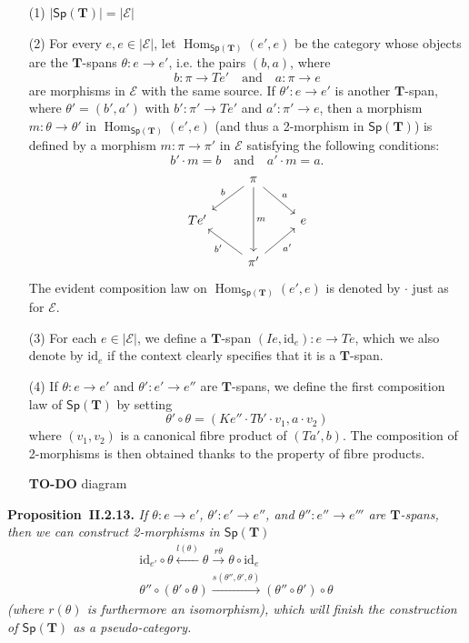 \documentclass[fleqn]{article}
\newenvironment{itenv}[1]
  {\phantomsection\par\medskip\noindent\textbf{#1.}\itshape}
  {\par\medskip}
\newcommand{\oldpage}[1]{\marginpar{\footnotesize$\Big\vert$ \textit{p.~#1}}}
\newcommand{\todo}{{\color{purple}\textbf{TO-DO }}}
\newcommand{\id}{\mathrm{id}}
\newcommand{\TT}{\mathbf{T}}
\newcommand{\textand}{\quad\text{and}\quad}
\newcommand{\cat}[1]{\mathcal{#1}}
\newcommand{\Cat}[1]{\mathsf{#1}}
\newcommand{\set}[1]{|#1|}
\newcommand{\Sp}[1]{\Cat{Sp}(#1)}
\DeclareMathOperator{\Hom}{Hom}
\begin{document}
\begin{enumerate}
  \item[(1)]
    $\set{\Sp{\TT}}=\set{\cat{E}}$

  \item[(2)]
    For every $e,e\in\set{\cat{E}}$, let $\Hom_{\Sp{\TT}}(e',e)$ be the category whose objects are the $\TT$-spans $\theta\colon e\to e'$, i.e. the pairs $(b,a)$, where
    \[
      b\colon\pi\to Te'
      \textand
      a\colon \pi\to e
    \]
    are morphisms in $\cat{E}$ with the same source.
    If $\theta'\colon e\to e'$ is another $\TT$-span, where $\theta'=(b',a')$ with $b'\colon\pi'\to Te'$ and $a'\colon\pi'\to e$, then a morphism $m\colon\theta\to\theta'$ in $\Hom_{\Sp{\TT}}(e',e)$ (and thus a 2-morphism in $\Sp{\TT}$) is defined by a morphism $m\colon\pi\to\pi'$ in $\cat{E}$ satisfying the following conditions:
    \[
      b'\cdot m = b
      \textand
      a'\cdot m = a.
    \]
    \[
      \begin{tikzcd}
      & \pi
          \ar[dl,swap,"b"]
          \ar[dr,"a"]
          \ar[dd,"m"]
      \\Te'
      &&e
      \\&\pi'
          \ar[ul,"b'"]
          \ar[ur,swap,"a'"]
      \end{tikzcd}
    \]
    The evident composition law on $\Hom_{\Sp{\TT}}(e',e)$ is denoted by $\cdot$ just as for $\cat{E}$.

  \item[(3)]
    For each $e\in\set{\cat{E}}$, we define a $\TT$-span $(Ie,\id_e)\colon e\to Te$, which we also denote by $\id_e$ if the context clearly specifies that it is a $\TT$-span.

  \item[(4)]
    If $\theta\colon e\to e'$ and $\theta'\colon e'\to e''$ are $\TT$-spans, we define the first composition law of $\Sp{\TT}$ by setting
    \[
      \theta'\circ\theta
      = (Ke''\cdot Tb'\cdot v_1, a\cdot v_2)
    \]
    where $(v_1,v_2)$ is a canonical fibre product of $(Ta',b)$.
    The composition of 2-morphisms is then obtained thanks to the property of fibre products.

    \oldpage{249}
    \todo{diagram}
\end{enumerate}

\begin{itenv}{Proposition~II.2.13}
  If $\theta\colon e\to e'$, $\theta'\colon e'\to e''$, and $\theta''\colon e''\to e'''$ are $\TT$-spans, then we can construct 2-morphisms in $\Sp{\TT}$
  \[
    \begin{gathered}
      \id_{e'}\circ\theta
      \xleftarrow{l(\theta)} \theta
      \xrightarrow{r\theta} \theta\circ\id_e
    \\\theta''\circ(\theta'\circ\theta)
      \xrightarrow{s(\theta'',\theta',\theta)} (\theta''\circ\theta')\circ\theta
    \end{gathered}
  \]
   (where $r(\theta)$ is furthermore an isomorphism), which will finish the construction of $\Sp{\TT}$ as a pseudo-category.
\end{itenv}
\end{document}
